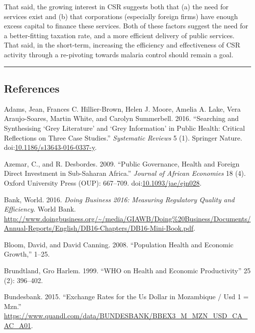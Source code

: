 \documentclass[]{elsarticle} %
\begin{document}
That said, the growing interest in CSR suggests both that (a) the need
for services exist and (b) that corporations (especially foreign firms)
have enough excess capital to finance these services. Both of these
factors suggest the need for a better-fitting taxation rate, and a more
efficient delivery of public services. That said, in the short-term,
increasing the efficiency and effectiveness of CSR activity through a
re-pivoting towards malaria control should remain a goal.

\begin{center}\rule{0.5\linewidth}{\linethickness}\end{center}

\subsection*{References}\label{references}

\hypertarget{refs}{}
\hypertarget{ref-Adams2016}{}
Adams, Jean, Frances C. Hillier-Brown, Helen J. Moore, Amelia A. Lake,
Vera Araujo-Soares, Martin White, and Carolyn Summerbell. 2016.
``Searching and Synthesising `Grey Literature' and `Grey Information' in
Public Health: Critical Reflections on Three Case Studies.''
\emph{Systematic Reviews} 5 (1). Springer Nature.
doi:\href{https://doi.org/10.1186/s13643-016-0337-y}{10.1186/s13643-016-0337-y}.

\hypertarget{ref-Azemar2009}{}
Azemar, C., and R. Desbordes. 2009. ``Public Governance, Health and
Foreign Direct Investment in Sub-Saharan Africa.'' \emph{Journal of
African Economies} 18 (4). Oxford University Press (OUP): 667--709.
doi:\href{https://doi.org/10.1093/jae/ejn028}{10.1093/jae/ejn028}.

\hypertarget{ref-doingbusiness}{}
Bank, World. 2016. \emph{Doing Business 2016: Measuring Regulatory
Quality and Efficiency}. World Bank.
\url{http://www.doingbusiness.org/~/media/GIAWB/Doing\%20Business/Documents/Annual-Reports/English/DB16-Chapters/DB16-Mini-Book.pdf}.

\hypertarget{ref-Bloom2008}{}
Bloom, David, and David Canning. 2008. ``Population Health and Economic
Growth,'' 1--25.

\hypertarget{ref-World1999}{}
Brundtland, Gro Harlem. 1999. ``WHO on Health and Economic
Productivity'' 25 (2): 396--402.

\hypertarget{ref-deutsche}{}
Bundesbank. 2015. ``Exchange Rates for the Us Dollar in Mozambique / Usd
1 = Mzn.''
\url{https://www.quandl.com/data/BUNDESBANK/BBEX3_M_MZN_USD_CA_AC_A01}.
\end{document}
